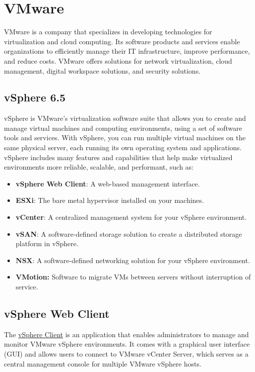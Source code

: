 \section{VMware} \label{section: VMware}

VMware is a company that specializes in developing technologies for virtualization and cloud computing. Its software products and services enable organizations to efficiently manage their IT infrastructure, improve performance, and reduce costs. VMware offers solutions for network virtualization, cloud management, digital workspace solutions, and security solutions.

\subsection{vSphere 6.5}
vSphere is VMware's virtualization software suite that allows you to create and manage virtual machines and computing environments, using a set of software tools and services. With vSphere, you can run multiple virtual machines on the same physical server, each running its own operating system and applications. vSphere includes many features and capabilities that help make virtualized environments more reliable, scalable, and performant, such as: 

\begin{itemize}
    \item \textbf{vSphere Web Client}: A web-based management interface. 
    \item \textbf{ESXi}: The bare metal hypervisor installed on your machines. 
    \item \textbf{vCenter}: A centralized management system for your vSphere environment.
    \item \textbf{vSAN}: A software-defined storage solution to create a distributed storage platform in vSphere.
    \item \textbf{NSX}: A software-defined networking solution for your vSphere environment.
    \item \textbf{VMotion:} Software to migrate VMs between servers without interruption of service.
\end{itemize}

\subsection{vSphere Web Client}
The \href{https://docs.vmware.com/en/VMware-vSphere/7.0/com.vmware.vsphere.vcenterhost.doc/GUID-A618EF76-638A-49DA-991D-B93C5AC0E2B1.html}{vSphere Client} is an application that enables administrators to manage and monitor VMware vSphere environments. It comes with a graphical user interface (GUI) and allows users to connect to VMware vCenter Server, which serves as a central management console for multiple VMware vSphere hosts.

